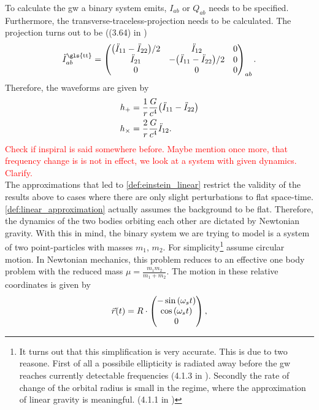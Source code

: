 \noindent To calculate the \gls{gw} a binary system emits, $I_{ab}$ or $Q_{ab}$ needs to be specified. Furthermore, the transverse-traceless-projection needs to be calculated. The projection turns out to be ((3.64) in \cite{gwv1})
\begin{equation}
\ddot{I}_{ab}^\text{\gls{tt}}=
\begin{pmatrix}
\lr{\ddot{I}_{11}-\ddot{I}_{22}}/2 & \ddot{I}_{12}                     & 0\\
\ddot{I}_{21}                      & -\lr{\ddot{I}_{11}-\ddot{I}_{22}}/2 & 0\\
0                                  & 0                                 & 0
\end{pmatrix}_{ab}.
\end{equation}
Therefore, the waveforms are given by
\begin{align}
h_+ & = \frac{1}{r}\frac{G}{c^4}{\left( \ddot{I}_{11}-\ddot{I}_{22} \right)}\\
h_\times & = \frac{2}{r}\frac{G}{c^4}\ddot{I}_{12}.
\end{align}
\textcolor{red}{Check if inspiral is said somewhere before. Maybe mention once more, that frequency change is is not in effect, we look at a system with given dynamics. Clarify.}\\
The approximations that led to \eqref{def:einstein_linear} restrict the validity of the results above to cases where there are only slight perturbations to flat space-time. \eqref{def:linear_approximation} actually assumes the background to be flat. Therefore, the dynamics of the two bodies orbiting each other are dictated by Newtonian gravity. With this in mind, the binary system we are trying to model is a system of two point-particles with masses $m_1$, $m_2$. For simplicity\footnote{It turns out that this simplification is very accurate. This is due to two reasone. First of all a possibile ellipticity is radiated away before the \gls{gw} reaches currently detectable frequencies (4.1.3 in \cite{gwv1}). Secondly the rate of change of the orbital radius is small in the regime, where the approximation of linear gravity is meaningful. (4.1.1 in \cite{gwv1})} assume circular motion. In Newtonian mechanics, this problem reduces to an effective one body problem with the reduced mass $\mu=\frac{m_1m_2}{m_1+m_2}$. The motion in these relative coordinates is given by
\begin{equation}\label{def:binary_motion}
\vec{r}{\left( t \right)} = R\cdot
\begin{pmatrix}
	-\sin{\left( \omega_s t \right)}\\
	\cos{\left( \omega_s t \right)}\\
	0
\end{pmatrix},
\end{equation}
